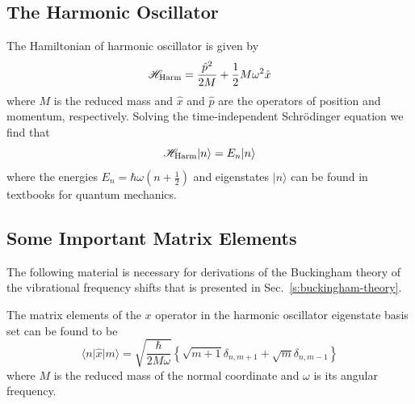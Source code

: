 \documentclass[a4paper,titlepage,twoside,fleqn,12pt]{book}
\begin{document}
\begin{appendices}
\section{The Harmonic Oscillator\label{a:harmonic-oscillator}}

The Hamiltonian of harmonic oscillator is given by
%
\begin{equation}\label{e:h_harm-appendix}
\mathscr{H}_{\rm Harm} = 
\frac{\hat{p}^2}{2M} + \frac{1}{2} M \omega^2 \hat{x}
\end{equation}
%
where $M$ is the reduced mass and $\hat{x}$ and $\hat{p}$ are the operators
of position and momentum, respectively. Solving the time\hyp{}independent 
Schr{\"o}dinger equation we find that 
%
\begin{equation}\label{e:h_harm-appendix-schreq}
\mathscr{H}_{\rm Harm} \vert n \rangle = 
E_n \vert n \rangle 
\end{equation}
%
where the energies $E_n=\hbar \omega \left( n+\frac{1}{2} \right)$ 
and eigenstates $\vert n \rangle$ can be found
in textbooks for quantum mechanics.

\subsection{Some Important Matrix Elements\label{a:matrix-elements}}

The following material is necessary for derivations of the Buckingham theory
of the vibrational frequency shifts that is presented in Sec.~\ref{s:buckingham-theory}. 

The matrix elements of the $x$ operator in the harmonic oscillator eigenstate basis set
can be found to be
%
\begin{equation}
\label{ea:mxn}
\langle n \vert \hat{x} \vert m \rangle = 
\sqrt{
\frac{\hbar}{2M\omega}
}
\left\{ 
   \sqrt{m+1} \delta_{n,m+1} + \sqrt{m} \delta_{n,m-1}
\right\}
\end{equation}
%
\noindent where $M$ is the reduced mass of the normal coordinate and $\omega$ is its 
angular frequency.


\end{appendices}
\end{document}

